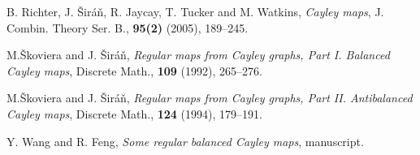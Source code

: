 \documentclass[12pt]{amsart}
\begin{document}
\begin{thebibliography}{99}
 B. Richter, J. \v Sir\' a\v n, R. Jaycay, T. Tucker and M. Watkins, \textit{Cayley maps},
 J. Combin. Theory Ser. B., {\bf 95(2)} (2005), 189--245.

 M.\v Skoviera and J. \v Sir\' a\v n, \textit{Regular maps from Cayley
graphs, Part I. Balanced Cayley maps}, Discrete Math., {\bf 109} (1992),
265--276.

 M.\v Skoviera and J. \v Sir\' a\v n, \textit{Regular maps from Cayley
graphs, Part II. Antibalanced Cayley maps}, Discrete Math., {\bf 124}
(1994), 179--191.

 Y. Wang and R. Feng, \textit{Some regular balanced Cayley maps},
               manuscript.
\end{thebibliography}
\end{document}
